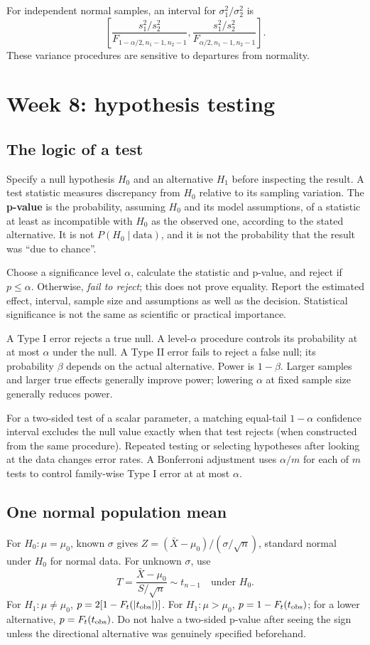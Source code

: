 For independent normal samples, an interval for $\sigma_1^2/\sigma_2^2$ is
\[
\left[\frac{s_1^2/s_2^2}{F_{1-\alpha/2,n_1-1,n_2-1}},
\frac{s_1^2/s_2^2}{F_{\alpha/2,n_1-1,n_2-1}}\right].
\]
These variance procedures are sensitive to departures from normality.

\clearpage
\section{Week 8: hypothesis testing}
\subsection{The logic of a test}
Specify a null hypothesis $H_0$ and an alternative $H_1$ before inspecting
the result. A test statistic measures discrepancy from $H_0$ relative to
its sampling variation. The \textbf{p-value} is the probability, assuming
$H_0$ and its model assumptions, of a statistic at least as incompatible
with $H_0$ as the observed one, according to the stated alternative.
It is not $P(H_0\mid\text{data})$, and it is not the probability that the
result was ``due to chance''.

Choose a significance level $\alpha$, calculate the statistic and p-value,
and reject if $p\leq\alpha$. Otherwise, \emph{fail to reject}; this does not
prove equality. Report the estimated effect, interval, sample size and
assumptions as well as the decision. Statistical significance is not the
same as scientific or practical importance.

A Type I error rejects a true null. A level-$\alpha$ procedure controls its
probability at at most $\alpha$ under the null. A Type II error fails to reject
a false null; its probability $\beta$ depends on the actual alternative.
Power is $1-\beta$. Larger samples and larger true effects generally improve
power; lowering $\alpha$ at fixed sample size generally reduces power.

For a two-sided test of a scalar parameter, a matching equal-tail
$1-\alpha$ confidence interval excludes the null value exactly when that
test rejects (when constructed from the same procedure).
Repeated testing or selecting hypotheses after looking at the data changes
error rates. A Bonferroni adjustment uses $\alpha/m$ for each of $m$ tests
to control family-wise Type I error at at most $\alpha$.

\subsection{One normal population mean}
For $H_0:\mu=\mu_0$, known $\sigma$ gives
$Z=(\bar X-\mu_0)/(\sigma/\sqrt n)$, standard normal under $H_0$ for normal
data. For unknown $\sigma$, use
\[
T=\frac{\bar X-\mu_0}{S/\sqrt n}\sim t_{n-1}\quad\text{under }H_0.
\]
For $H_1:\mu\ne\mu_0$, $p=2[1-F_t(|t_{\rm obs}|)]$.
For $H_1:\mu>\mu_0$, $p=1-F_t(t_{\rm obs})$; for a lower alternative,
$p=F_t(t_{\rm obs})$. Do not halve a two-sided p-value after seeing the sign
unless the directional alternative was genuinely specified beforehand.

